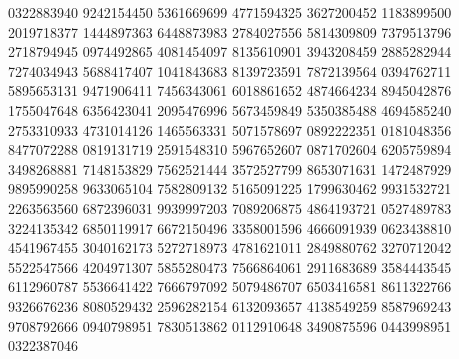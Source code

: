 {{0322883940 9242154450 5361669699 4771594325 3627200452 1183899500 2019718377
1444897363 6448873983 2784027556 5814309809 7379513796 2718794945 0974492865
4081454097 8135610901 3943208459 2885282944 7274034943 5688417407 1041843683
8139723591 7872139564 0394762711 5895653131 9471906411 7456343061 6018861652
4874664234 8945042876 1755047648 6356423041 2095476996 5673459849 5350385488
4694585240 2753310933 4731014126 1465563331 5071578697 0892222351 0181048356
8477072288 0819131719 2591548310 5967652607 0871702604 6205759894 3498268881
7148153829 7562521444 3572527799 8653071631 1472487929 9895990258 9633065104
7582809132 5165091225 1799630462 9931532721 2263563560 6872396031 9939997203
7089206875 4864193721 0527489783 3224135342 6850119917 6672150496 3358001596
4666091939 0623438810 4541967455 3040162173 5272718973 4781621011 2849880762
3270712042 5522547566 4204971307 5855280473 7566864061 2911683689 3584443545
6112960787 5536641422 7666797092 5079486707 6503416581 8611322766 9326676236
8080529432 2596282154 6132093657 4138549259 8587969243 9708792666 0940798951
7830513862 0112910648 3490875596 0443998951 0322387046 
}}

